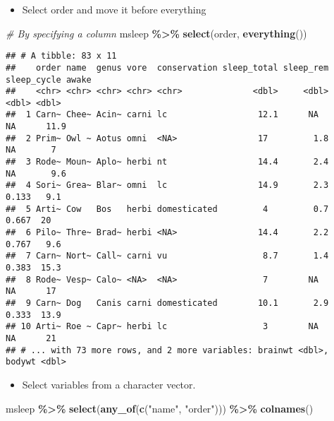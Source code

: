 \documentclass[
]{book}
\newenvironment{Shaded}{\begin{snugshade}}{\end{snugshade}}
\newcommand{\CommentTok}[1]{\textcolor[rgb]{0.56,0.35,0.01}{\textit{#1}}}
\newcommand{\KeywordTok}[1]{\textcolor[rgb]{0.13,0.29,0.53}{\textbf{#1}}}
\newcommand{\NormalTok}[1]{#1}
\newcommand{\OperatorTok}[1]{\textcolor[rgb]{0.81,0.36,0.00}{\textbf{#1}}}
\newcommand{\StringTok}[1]{\textcolor[rgb]{0.31,0.60,0.02}{#1}}
\providecommand{\tightlist}{%
  \setlength{\itemsep}{0pt}\setlength{\parskip}{0pt}}
\begin{document}
\begin{itemize}
\tightlist
\item
  Select order and move it before everything
\end{itemize}

\begin{Shaded}
\begin{Highlighting}[]
\CommentTok{\# By specifying a column}
\NormalTok{msleep }\OperatorTok{\%\textgreater{}\%}
\StringTok{  }\KeywordTok{select}\NormalTok{(order, }\KeywordTok{everything}\NormalTok{())}
\end{Highlighting}
\end{Shaded}

\begin{verbatim}
## # A tibble: 83 x 11
##    order name  genus vore  conservation sleep_total sleep_rem sleep_cycle awake
##    <chr> <chr> <chr> <chr> <chr>              <dbl>     <dbl>       <dbl> <dbl>
##  1 Carn~ Chee~ Acin~ carni lc                  12.1      NA        NA      11.9
##  2 Prim~ Owl ~ Aotus omni  <NA>                17         1.8      NA       7  
##  3 Rode~ Moun~ Aplo~ herbi nt                  14.4       2.4      NA       9.6
##  4 Sori~ Grea~ Blar~ omni  lc                  14.9       2.3       0.133   9.1
##  5 Arti~ Cow   Bos   herbi domesticated         4         0.7       0.667  20  
##  6 Pilo~ Thre~ Brad~ herbi <NA>                14.4       2.2       0.767   9.6
##  7 Carn~ Nort~ Call~ carni vu                   8.7       1.4       0.383  15.3
##  8 Rode~ Vesp~ Calo~ <NA>  <NA>                 7        NA        NA      17  
##  9 Carn~ Dog   Canis carni domesticated        10.1       2.9       0.333  13.9
## 10 Arti~ Roe ~ Capr~ herbi lc                   3        NA        NA      21  
## # ... with 73 more rows, and 2 more variables: brainwt <dbl>, bodywt <dbl>
\end{verbatim}

\begin{itemize}
\tightlist
\item
  Select variables from a character vector.
\end{itemize}

\begin{Shaded}
\begin{Highlighting}[]
\NormalTok{msleep }\OperatorTok{\%\textgreater{}\%}
\StringTok{  }\KeywordTok{select}\NormalTok{(}\KeywordTok{any\_of}\NormalTok{(}\KeywordTok{c}\NormalTok{(}\StringTok{"name"}\NormalTok{, }\StringTok{"order"}\NormalTok{))) }\OperatorTok{\%\textgreater{}\%}
\StringTok{  }\KeywordTok{colnames}\NormalTok{()}
\end{Highlighting}
\end{Shaded}
\end{document}
